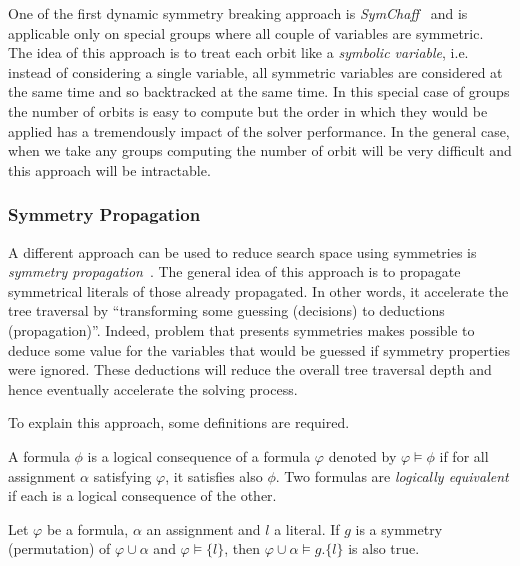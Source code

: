 One of the first dynamic symmetry breaking approach is \emph{SymChaff}~\cite{sabharwal2005symchaff}
and is applicable only on special groups where all couple of variables are symmetric.
The idea of this approach is to treat each orbit like a \emph{symbolic variable}, i.e. instead of considering a single
variable, all symmetric variables are considered at the same time and so backtracked at the same time.
In this special case of groups the number of orbits is easy to compute but the order in which they would be
applied has a tremendously impact of the solver performance.
In the general case, when we take any groups computing the number of orbit will be very difficult and this approach
will be intractable.


\subsubsection{Symmetry Propagation}

A different approach can be used to reduce search space using symmetries is \emph{symmetry propagation}~\cite{Devriendt12}.
The general idea of this approach is to propagate symmetrical literals of those already propagated.
In other words, it accelerate the tree traversal by ``transforming some guessing (decisions) to deductions (propagation)''.
Indeed, problem that presents symmetries makes possible to deduce some value 
for the variables that would be guessed if symmetry properties were ignored.
These deductions will reduce the overall tree traversal depth and hence eventually accelerate the solving process.

To explain this approach, some definitions are required.


\begin{definition}
	\label{def:logical_consequence}
	A formula $\phi$ is a logical consequence of a formula $\varphi$ denoted by $\varphi \models \phi$ if for all assignment
	$\alpha$ satisfying $\varphi$, it satisfies also $\phi$. Two formulas are \emph{logically equivalent} if each is a logical
	consequence of the other.
\end{definition}

\begin{proposition}
	\label{prop:symmetry_propagation}
	Let $\varphi$ be a formula, $\alpha$ an assignment and $l$ a literal. 
	If $g$ is a symmetry (permutation) of $\varphi \cup \alpha$ and
	$\varphi \models \{l\}$, then $\varphi \cup \alpha \models g.\{l\}$ is also true.
\end{proposition}


